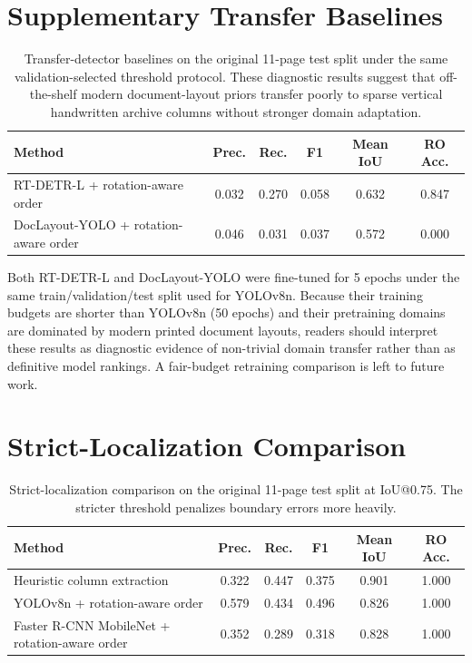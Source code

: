 \documentclass[pdflatex,sn-mathphys-num]{sn-jnl}
\begin{document}
\section{Supplementary Transfer Baselines}

\begin{table}[t]
\centering
\scriptsize\setlength{\tabcolsep}{3pt}
\caption{Transfer-detector baselines on the original 11-page test split under the same validation-selected threshold protocol. These diagnostic results suggest that off-the-shelf modern document-layout priors transfer poorly to sparse vertical handwritten archive columns without stronger domain adaptation.}
\begin{tabular}{lccccc}
\toprule
Method & Prec. & Rec. & F1 & Mean IoU & RO Acc. \\
\midrule
RT-DETR-L + rotation-aware order & 0.032 & 0.270 & 0.058 & 0.632 & 0.847 \\
DocLayout-YOLO + rotation-aware order & 0.046 & 0.031 & 0.037 & 0.572 & 0.000 \\
\bottomrule
\end{tabular}
\end{table}

Both RT-DETR-L and DocLayout-YOLO were fine-tuned for 5 epochs under the same train/validation/test split used for YOLOv8n. Because their training budgets are shorter than YOLOv8n (50 epochs) and their pretraining domains are dominated by modern printed document layouts, readers should interpret these results as diagnostic evidence of non-trivial domain transfer rather than as definitive model rankings. A fair-budget retraining comparison is left to future work.

\section{Strict-Localization Comparison}

\begin{table}[t]
\centering
\scriptsize\setlength{\tabcolsep}{3pt}
\caption{Strict-localization comparison on the original 11-page test split at IoU@0.75. The stricter threshold penalizes boundary errors more heavily.}
\begin{tabular}{lccccc}
\toprule
Method & Prec. & Rec. & F1 & Mean IoU & RO Acc. \\
\midrule
Heuristic column extraction & 0.322 & 0.447 & 0.375 & 0.901 & 1.000 \\
YOLOv8n + rotation-aware order & 0.579 & 0.434 & 0.496 & 0.826 & 1.000 \\
Faster R-CNN MobileNet + rotation-aware order & 0.352 & 0.289 & 0.318 & 0.828 & 1.000 \\
\bottomrule
\end{tabular}
\end{table}
\end{document}
